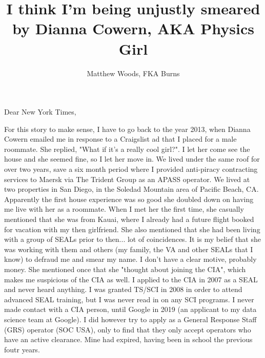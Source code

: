 \documentclass[a4paper]{arthur-letter}
\title{I think I'm being unjustly smeared by Dianna Cowern, AKA Physics Girl}
\author{Matthew Woods, FKA Burns}
\begin{document}
    \makeprofile %
    
    \address{Matthew Woods,\\PO Box 376\\Mountain View, CA, 94042}

    \begin{letter}

            \subject{TLDR: I'm a former Navy SEAL, smeared by Dianna Cowern (AKA Physics Girl) via Alphabet Inc while working as a Google employee. From 2015-2020, I have witnessed severe police misconduct. I think they may have ties to the Nazis, since I am an effective critic of them.}

            \opening{Dear New York Times,}

            For this story to make sense, I have to go back to the year 2013, when Dianna Cowern emailed me in response to a Craigslist ad that I placed for a male roommate. She replied, "What if it's a really cool girl?". I let her come see the house and she seemed fine, so I let her move in. We lived under the same roof for over two years, save a six month period where I provided anti-piracy contracting services to Maersk via The Trident Group as an APASS operator. We lived at two properties in San Diego, in the Soledad Mountain area of Pacific Beach, CA. Apparently the first house experience was so good she doubled down on having me live with her as a roommate. When I met her the first time, she casually mentioned that she was from Kauai, where I already had a future flight booked for vacation with my then girlfriend. She also mentioned that she had been living with a group of SEALs prior to then... lot of coincidences. It is my belief that she was working with them and others (my family, the VA and other SEALs that I know) to defraud me and smear my name. I don't have a clear motive, probably money. She mentioned once that she "thought about joining the CIA", which makes me suspicious of the CIA as well. I applied to the CIA in 2007 as a SEAL and never heard anything. I was granted TS/SCI in 2008 in order to attend advanced SEAL training, but I was never read in on any SCI programs. I never made contact with a CIA person, until Google in 2019 (an applicant to my data science team at Google). I did however try to apply as a General Response Staff (GRS) operator (SOC USA), only to find that they only accept operators who have an active clearance. Mine had expired, having been in school the previous foutr years. \\ 
            

\end{letter}
\end{document}
